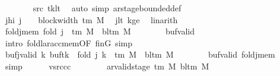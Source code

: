 \begin{isabellebody}
\ \ \ \ \ \ \isamarkupfalse%
\ src{}\ tk{\isacharunderscore}{\kern0pt}lt\ \isamarkupfalse%
\ {\isacharparenleft}{\kern0pt}auto\ simp{\isacharcolon}{\kern0pt}\ ar{\isacharunderscore}{\kern0pt}stage{\isacharunderscore}{\kern0pt}bounded{\isacharunderscore}{\kern0pt}def{\isacharparenright}{\kern0pt}\isanewline
\ \ \ \ \isamarkupfalse%
\ jhi{\isacharcolon}{\kern0pt}\ {\isachardoublequoteopen}j\ {\isacharplus}{\kern0pt}\ {}\ {\isasymle}\ block{\isacharunderscore}{\kern0pt}width\ {\isacharparenleft}{\kern0pt}{\isasymGamma}{\isacharunderscore}{\kern0pt}tm\ M{\isacharparenright}{\kern0pt}{\isachardoublequoteclose}\ \isamarkupfalse%
\ jlt\ kge{}\ \isamarkupfalse%
\ linarith\isanewline
\ \ \ \ \isamarkupfalse%
\ foldj{\isacharunderscore}{\kern0pt}mem{\isacharcolon}{\kern0pt}\ {\isachardoublequoteopen}{\isacharquery}{\kern0pt}fold\ j\ {\isasymin}\ {\isasymGamma}{\isacharunderscore}{\kern0pt}tm\ M\ {\isasymunion}\ {\isacharbraceleft}{\kern0pt}bl{\isacharunderscore}{\kern0pt}tm\ M{\isacharbraceright}{\kern0pt}{\isachardoublequoteclose}\isanewline
\ \ \ \ \ \ \isamarkupfalse%
\ buf{}{\isacharunderscore}{\kern0pt}valid\ \isamarkupfalse%
\ {\isacharparenleft}{\kern0pt}intro\ foldl{\isacharunderscore}{\kern0pt}ar{\isacharunderscore}{\kern0pt}acc{\isacharunderscore}{\kern0pt}mem{\isacharbrackleft}{\kern0pt}OF\ finG{\isacharbrackright}{\kern0pt}{\isacharparenright}{\kern0pt}\ simp\isanewline
\ \ \ \ \isamarkupfalse%
\ bufj{\isacharunderscore}{\kern0pt}valid{\isacharcolon}{\kern0pt}\ {\isachardoublequoteopen}{\isasymforall}k{\isachardot}{\kern0pt}\ {\isacharparenleft}{\kern0pt}buf{}{\isacharparenleft}{\kern0pt}tk\ {\isacharcolon}{\kern0pt}{\isacharequal}{\kern0pt}\ {\isacharquery}{\kern0pt}fold\ j{\isacharparenright}{\kern0pt}{\isacharparenright}{\kern0pt}\ k\ {\isasymin}\ {\isasymGamma}{\isacharunderscore}{\kern0pt}tm\ M\ {\isasymunion}\ {\isacharbraceleft}{\kern0pt}bl{\isacharunderscore}{\kern0pt}tm\ M{\isacharbraceright}{\kern0pt}{\isachardoublequoteclose}\isanewline
\ \ \ \ \ \ \isamarkupfalse%
\ buf{}{\isacharunderscore}{\kern0pt}valid\ foldj{\isacharunderscore}{\kern0pt}mem\ \isamarkupfalse%
\ simp\isanewline
\ \ \ \ \isamarkupfalse%
\ vsrc{\isacharunderscore}{\kern0pt}cc{\isacharcolon}{\kern0pt}\isanewline
\ \ \ \ \ \ \ \ {\isachardoublequoteopen}ar{\isacharunderscore}{\kern0pt}valid{\isacharunderscore}{\kern0pt}stage\ {\isacharparenleft}{\kern0pt}{\isasymGamma}{\isacharunderscore}{\kern0pt}tm\ M{\isacharparenright}{\kern0pt}\ {\isacharparenleft}{\kern0pt}bl{\isacharunderscore}{\kern0pt}tm\ M{\isacharparenright}{\kern0pt}\isanewline

\end{isabellebody}
